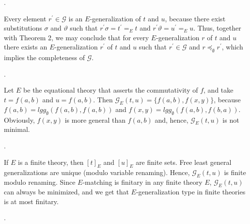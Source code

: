   
\par{}. 
 
Every element $r^{\prime}\in\mathcal{G}$ is an $E$-generalization of $t$ and $u$, because there exist substitutions $\sigma$ and $\vartheta$ such that $r^{\prime}\sigma=t^{\prime}=_{E}t$ and $r^{\prime}\vartheta=u^{\prime}=_{E}u$. Thus, together with Theorem 2, we may conclude that for every $E$-generalization $r$ of $t$ and $u$ there exists an $E$-generalization $r^{\prime}$ of $t$ and $u$ such that $r^{\prime}\in\mathcal{G}$ and $r\preceq_{\emptyset}r^{\prime}$, which implies the completeness of $\mathcal{G}$.\par
 
 
 
\par{}. 
 
Let $E$ be the equational theory that asserts the commutativity of $f$, and take $t=f(a,b)$ and $u=f(a,b)$. Then $\mathcal{G}_{E}(t,u)=\{f(a,b),f(x,y)\}$, because $f(a,b)=\mathit{lgg}_{\emptyset}(f(a,b),f(a,b))$ and $f(x,y)=\mathit{lgg}_{\emptyset}(f(a,b),f(b,a))$. Obviously, $f(x,y)$ is more general than $f(a,b)$ and, hence, $\mathcal{G}_{E}(t,u)$ is not minimal.\par
 
 
 
\par{}. 
 
If $E$ is a finite theory, then $[t]_{E}$ and $[u]_{E}$ are finite sets. Free least general generalizations are unique (modulo variable renaming). Hence, $\mathcal{G}_{E}(t,u)$ is finite modulo renaming. Since $E$-matching is finitary in any finite theory $E$, $\mathcal{G}_{E}(t,u)$ can always be minimized, and we get that $E$-generalization type in finite theories is at most finitary.\par
 
 
 
\par{}. 
 
